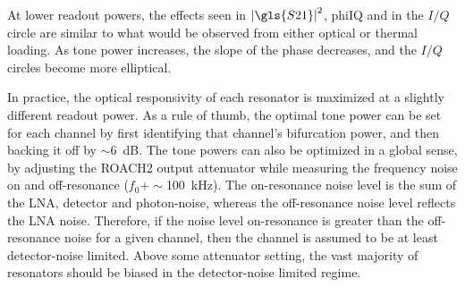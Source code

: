 At lower readout powers, the effects seen in $\left| \gls{S21} \right|^{2}$, \gls{phiIQ} and in the $I/Q$ circle are similar to what would be observed from either optical or thermal loading. As tone power increases, the slope of the phase decreases, and the $I/Q$ circles become more elliptical.

In practice, the optical responsivity of each resonator is maximized at a slightly different readout power. As a rule of thumb, the optimal tone power can be set for each channel by first identifying that channel's bifurcation power, and then backing it off by $\sim$6~dB. The tone powers can also be optimized in a global sense, by adjusting the ROACH2 output attenuator while measuring the frequency noise on and off-resonance ($f_{0} + \sim$100~kHz). The on-resonance noise level is the sum of the LNA, detector and photon-noise, whereas the off-resonance noise level reflects the LNA noise. Therefore, if the noise level on-resonance is greater than the off-resonance noise for a given channel, then the channel is assumed to be at least detector-noise limited. Above some attenuator setting, the vast majority of resonators should be biased in the detector-noise limited regime.

